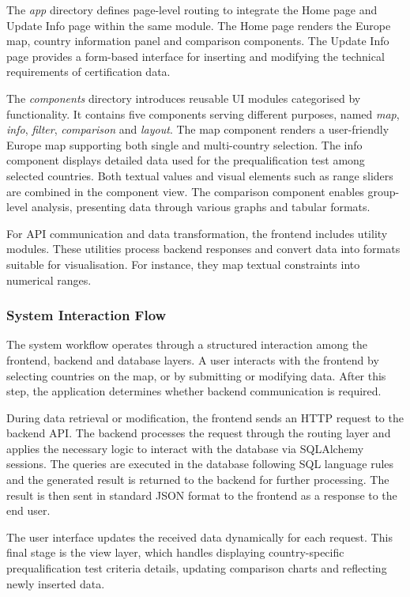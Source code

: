 The \textit{app} directory defines page-level routing to integrate the Home page and Update Info page within the same module. The Home page renders the Europe map, country information panel and comparison components. The Update Info page provides a form-based interface for inserting and modifying the technical requirements of certification data.

The \textit{components} directory introduces reusable UI modules categorised by functionality. It contains five components serving different purposes, named \textit{map}, \textit{info}, \textit{filter}, \textit{comparison} and \textit{layout}. The map component renders a user-friendly Europe map supporting both single and multi-country selection. The info component displays detailed data used for the prequalification test among selected countries. Both textual values and visual elements such as range sliders are combined in the component view. The comparison component enables group-level analysis, presenting data through various graphs and tabular formats.

For API communication and data transformation, the frontend includes utility modules. These utilities process backend responses and convert data into formats suitable for visualisation. For instance, they map textual constraints into numerical ranges.

\subsubsection{System Interaction Flow}
The system workflow operates through a structured interaction among the frontend, backend and database layers. A user interacts with the frontend by selecting countries on the map, or by submitting or modifying data. After this step, the application determines whether backend communication is required.

During data retrieval or modification, the frontend sends an HTTP request to the backend API. The backend processes the request through the routing layer and applies the necessary logic to interact with the database via SQLAlchemy sessions. The queries are executed in the database following SQL language rules and the generated result is returned to the backend for further processing. The result is then sent in standard JSON format to the frontend as a response to the end user.

The user interface updates the received data dynamically for each request. This final stage is the view layer, which handles displaying country-specific prequalification test criteria details, updating comparison charts and reflecting newly inserted data.

